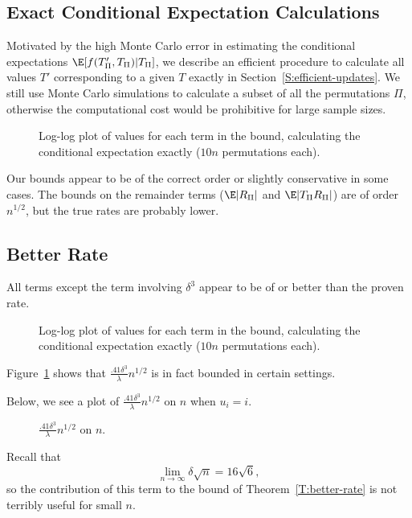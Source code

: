 \subsection{Exact Conditional Expectation Calculations}
Motivated by the high Monte Carlo error in estimating the conditional expectations
$\E[f(T'_{\Pi}, T_{\Pi}) | T_{\Pi}]$, we describe an efficient procedure to
calculate all values $T'$ corresponding to a given $T$ exactly in Section~\ref{S:efficient-updates}.
We still use Monte Carlo simulations to calculate a subset of all the permutations $\Pi$, otherwise
the computational cost would be prohibitive for large sample sizes.
\begin{figure}[!ht]
  \centering
  
  \caption{Log-log plot of values for each term in the bound, calculating the conditional
    expectation exactly ($10n$ permutations each).}
\end{figure}

Our bounds appear to be of the correct order or slightly conservative in some cases.  The bounds on
the remainder terms ($\E |R_{\Pi}|$ and $\E |T_{\Pi}R_{\Pi}|$) are of order $n^{1/2}$, but the true
rates are probably lower.
\clearpage

\subsection{Better Rate}
All terms except the term involving $\delta^3$ appear to be of or better than the proven rate.
\begin{figure}[!ht]
  \centering
  
  \caption{Log-log plot of values for each term in the bound, calculating the conditional
    expectation exactly ($10n$ permutations each).}
\end{figure}

Figure~\ref{fig:delta_plot} shows that $\frac{.41 \delta^3}{\lambda}n^{1/2}$
is in fact bounded in certain settings.
\clearpage

Below, we see a plot of $\frac{.41 \delta^3}{\lambda}n^{1/2}$ on $n$
when $u_i = i$.
\begin{figure}[!ht]
  \centering
  
  \caption{$\frac{.41 \delta^3}{\lambda}n^{1/2}$ on $n$.}
  \label{fig:delta_plot}
\end{figure}

Recall that
\begin{equation*}
  \lim_{n \to \infty} \delta \sqrt{n} = 16 \sqrt{6},
\end{equation*}
so the contribution of this term to the bound of Theorem~\ref{T:better-rate}
is not terribly useful for small $n$.

